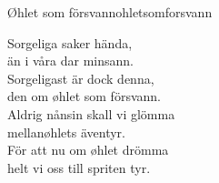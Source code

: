 \begin{song}{Øhlet som försvann}{ohletsomforsvann}
\begin{vers}
Sorgeliga saker hända,\\
än i våra dar minsann.\\
Sorgeligast är dock denna,\\
den om øhlet som försvann.\\
Aldrig nånsin skall vi glömma\\
mellanøhlets äventyr.\\
För att nu om øhlet drömma\\
helt vi oss till spriten tyr.\\
\end{vers}
\end{song}
